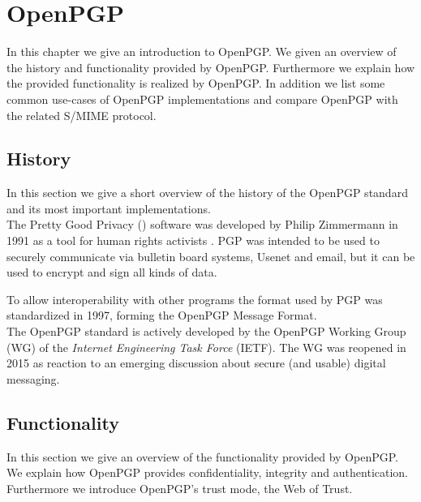 \chapter{OpenPGP} \label{chapter:openpgp}

In this chapter we give an introduction to OpenPGP. We given an overview of the history and functionality provided by OpenPGP. Furthermore we explain how the provided functionality is realized by OpenPGP. In addition we list some common use-cases of OpenPGP implementations and compare OpenPGP with the related S/MIME protocol. 


\section{History}  \label{section:openpgp:history}

In this section we give a short overview of the history of the OpenPGP standard and its most important implementations. \\


The Pretty Good Privacy () software was developed by Philip Zimmermann in 1991 \cite{PGP1} as a tool for human rights activists \cite{PGP2}. PGP was intended to be used to securely communicate via bulletin board systems, Usenet and email, but it can be used to encrypt and sign all kinds of data.

To allow interoperability with other programs the format used by PGP was standardized in 1997, forming the OpenPGP Message Format. \\


The OpenPGP standard is actively developed by the OpenPGP Working Group (WG) of the \textit{Internet Engineering Task Force} (IETF). The WG was reopened in 2015 as reaction to an emerging discussion about secure (and usable) digital messaging.

\section{Functionality} \label{section:openpgp:functionality}

In this section we give an overview of the functionality provided by OpenPGP. We explain how OpenPGP provides confidentiality, integrity
and authentication. Furthermore we introduce OpenPGP's trust mode, the Web of Trust.  \\


